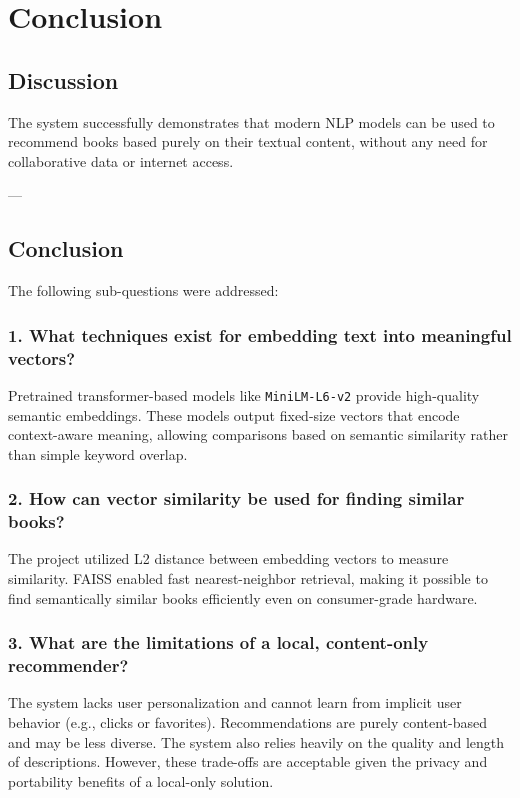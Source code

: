 \chapter{Conclusion}
\label{chapter:conclusion}

\section{Discussion}
\label{sec:discussion}

The system successfully demonstrates that modern NLP models can be used to recommend books based purely on their textual content, without any need for collaborative data or internet access.

---

\section{Conclusion}
\label{sec:conclusion}

The following sub-questions were addressed:

\subsection*{1. What techniques exist for embedding text into meaningful vectors?}
Pretrained transformer-based models like \texttt{MiniLM-L6-v2} provide high-quality semantic embeddings. These models output fixed-size vectors that encode context-aware meaning, allowing comparisons based on semantic similarity rather than simple keyword overlap.

\subsection*{2. How can vector similarity be used for finding similar books?}
The project utilized L2 distance between embedding vectors to measure similarity. FAISS enabled fast nearest-neighbor retrieval, making it possible to find semantically similar books efficiently even on consumer-grade hardware.

\subsection*{3. What are the limitations of a local, content-only recommender?}
The system lacks user personalization and cannot learn from implicit user behavior (e.g., clicks or favorites). Recommendations are purely content-based and may be less diverse. The system also relies heavily on the quality and length of descriptions. However, these trade-offs are acceptable given the privacy and portability benefits of a local-only solution.

